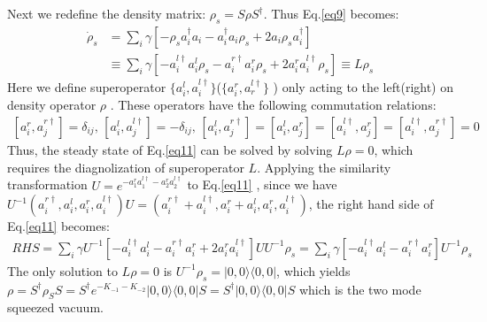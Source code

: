 \documentclass{article}
\begin{document}
Next we redefine the density matrix: $\rho_{s}=S\rho S^{\dagger}$. Thus Eq.\eqref{eq9} becomes:
\begin{equation}
\label{eq11}
\begin{split}
\dot{\rho}_{s}&=\sum_{i}\gamma[-\rho_{s}a_{i}^{\dagger}a_{i}-a_{i}^{\dagger}a_{i}\rho_{s}+2a_{i}\rho_{s}a_{i}^{\dagger}]\\
&\equiv\sum_{i}\gamma[-a_{i}^{l\dagger}a_{i}^{l}\rho_{s}-a_{i}^{r\dagger}a_{i}^{r}\rho_{s}+2a_{i}^{r}a_{i}^{l\dagger}\rho_{s}]\equiv L\rho_{s}
\end{split}
\end{equation}
Here we define superoperator $\{a_{i}^{l}, a_{i}^{l\dagger}\}$($\{a_{i}^{r}, a_{r}^{l\dagger}\}$ ) only acting to the left(right) on density operator $\rho$ \cite{Wang2002, An}. These operators have the following commutation relations: 
\begin{equation}
\label{eq12}
\begin{split}
[a_{i}^{r},a_{j}^{r\dagger}]=\delta_{ij},\,[a_{i}^{l},a_{j}^{l\dagger}]=-\delta_{ij},\,[a_{i}^{l},a_{j}^{r\dagger}]=[a_{i}^{l},a_{j}^{r}]=[a_{i}^{l\dagger},a_{j}^{r}]=[a_{i}^{l\dagger},a_{j}^{r\dagger}]=0
\end{split}
\end{equation}
Thus, the steady state of Eq.\eqref{eq11} can be solved by solving $L\rho=0$, which requires the diagnolization of superoperator $L$. Applying the similarity transformation $U=e^{-a_{1}^{r}a_{1}^{l\dagger}-a_{2}^{r}a_{2}^{l\dagger}}$ to Eq.\eqref{eq11} , since we have $U^{-1}(a_{i}^{r\dagger},a_{i}^{l},a_{i}^{r},a_{i}^{l\dagger})U=(a_{i}^{r\dagger}+a_{i}^{l\dagger},a_{i}^{r}+a_{i}^{l},a_{i}^{r},a_{i}^{l\dagger})$, the right hand side of Eq.\eqref{eq11} becomes:
\begin{equation}
\label{eq13}
\begin{split}
RHS=\sum_{i}\gamma U^{-1}[-a_{i}^{l\dagger}a_{i}^{l}-a_{i}^{r\dagger}a_{i}^{r}+2a_{i}^{r}a_{i}^{l\dagger}]UU^{-1}\rho_{s}=\sum_{i}\gamma[-a_{i}^{l\dagger}a_{i}^{l}-a_{i}^{r\dagger}a_{i}^{r}]U^{-1}\rho_{s}
\end{split}
\end{equation}
The only solution to $L\rho=0$ is $U^{-1}\rho_{s}=|0,0\rangle\langle0,0|$, which yields $\rho=S^{\dagger}\rho_S S=S^{\dagger}e^{-K_{-1}-K_{-2}}|0,0\rangle\langle0,0|S=S^{\dagger}|0,0\rangle\langle0,0|S$ which is the two mode squeezed vacuum.
\end{document}
